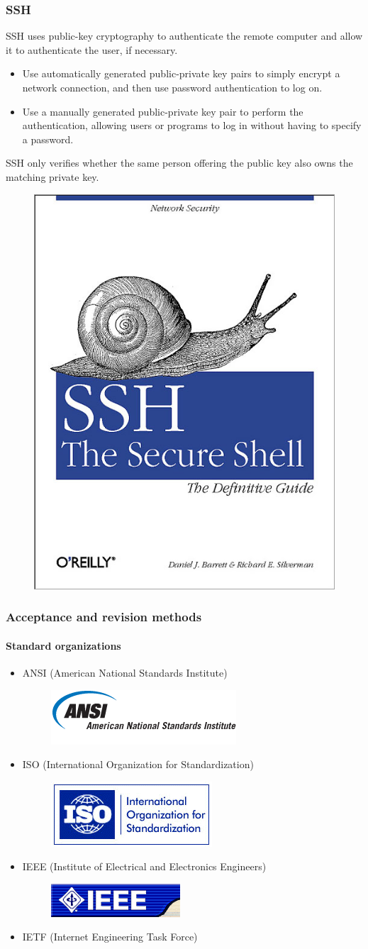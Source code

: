 \documentclass{beamer}
\begin{document}
\begin{frame}
\frametitle{SSH}
SSH uses public-key cryptography to authenticate the remote computer and allow it to authenticate the user, if necessary.
\begin{itemize}
\item Use automatically generated public-private key pairs to simply encrypt a network connection, and then use password authentication to log on.
\item Use a manually generated public-private key pair to perform the authentication, allowing users or programs to log in without having to specify a password.
\end{itemize}
SSH only verifies whether the same person offering the public key also owns the matching private key.
\begin{figure}
\includegraphics[width=0.1\linewidth]{librossh.jpg}
\end{figure}
\end{frame}


\begin{frame}
\frametitle{Acceptance and revision methods}
\framesubtitle{Standard organizations}
\begin{itemize}
\item ANSI (American National Standards Institute)
\begin{figure}
\includegraphics[width=0.3\linewidth]{ansi.png}
\end{figure}
\item ISO (International Organization for Standardization)
\begin{figure}
\includegraphics[width=0.3\linewidth]{iso.png}
\end{figure}
\item IEEE (Institute of Electrical and Electronics Engineers)
\begin{figure}
\includegraphics[width=0.3\linewidth]{ieee.png}
\end{figure}
\item IETF (Internet Engineering Task Force)
\end{itemize}
\end{frame}
\end{document}
